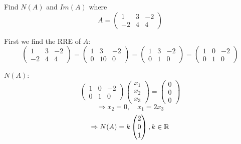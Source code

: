 \documentclass[a4paper,10pt]{article}
\begin{document}
\begin{ex}
	Find $N(A)$ and $Im(A)$ where
	\[
		A =
		\begin{pmatrix}
			1  & 3 & -2 \\
			-2 & 4 & 4
		\end{pmatrix}
	\]

	First we find the RRE of $A$:
	\[
		\begin{pmatrix}
			1  & 3 & -2 \\
			-2 & 4 & 4
		\end{pmatrix}
		=
		\begin{pmatrix}
			1 & 3  & -2 \\
			0 & 10 & 0
		\end{pmatrix}
		=
		\begin{pmatrix}
			1 & 3 & -2 \\
			0 & 1 & 0
		\end{pmatrix}
		=
		\begin{pmatrix}
			1 & 0 & -2 \\
			0 & 1 & 0
		\end{pmatrix}
	\]

	$N(A)$:
	\[
		\begin{pmatrix}
			1 & 0 & -2 \\
			0 & 1 & 0
		\end{pmatrix}
		\begin{pmatrix}
			x_1 \\
			x_2 \\
			x_3
		\end{pmatrix}
		=
		\begin{pmatrix}
			0 \\
			0 \\
			0
		\end{pmatrix}
	\]
	\[
		\Rightarrow x_2 = 0, \quad x_1 = 2x_3
	\]
	\[
		\Rightarrow N(A) = k
		\begin{pmatrix}
			2 \\
			0 \\
			1
		\end{pmatrix}
		, k \in \mathbb{R}
	\]


\end{ex}
\end{document}
